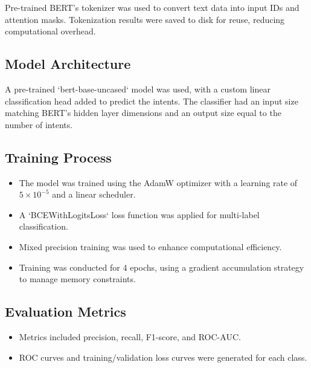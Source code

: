         Pre-trained BERT's tokenizer was used to convert text data into input IDs and attention masks. Tokenization results were saved to disk for reuse, reducing computational overhead.

    \subsection{Model Architecture}
    
        A pre-trained `bert-base-uncased` model was used, with a custom linear classification head added to predict the intents. The classifier had an input size matching BERT's hidden layer dimensions and an output size equal to the number of intents.

    \subsection{Training Process}
    
        \begin{itemize}
        
            \item The model was trained using the AdamW optimizer with a learning rate of $5 \times 10^{-5}$ and a linear scheduler.
            
            \item A `BCEWithLogitsLoss` loss function was applied for multi-label classification.
            
            \item Mixed precision training was used to enhance computational efficiency.
            
            \item Training was conducted for 4 epochs, using a gradient accumulation strategy to manage memory constraints.
            
        \end{itemize}

    \subsection{Evaluation Metrics}
    
        \begin{itemize}
        
            \item Metrics included precision, recall, F1-score, and ROC-AUC.
            
            \item ROC curves and training/validation loss curves were generated for each class.
            
        \end{itemize}

